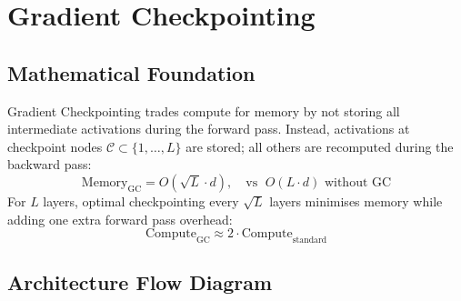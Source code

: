\newpage
\section{Gradient Checkpointing}

\subsection{Mathematical Foundation}
Gradient Checkpointing trades compute for memory by not storing all intermediate activations during the forward pass. Instead, activations at checkpoint nodes $\mathcal{C} \subset \{1,\ldots,L\}$ are stored; all others are recomputed during the backward pass:
\begin{equation}
  \text{Memory}_{\text{GC}} = O(\sqrt{L} \cdot d),\quad \text{vs }\; O(L \cdot d) \text{ without GC}
\end{equation}
For $L$ layers, optimal checkpointing every $\sqrt{L}$ layers minimises memory while adding one extra forward pass overhead:
\begin{equation}
  \text{Compute}_{\text{GC}} \approx 2 \cdot \text{Compute}_{\text{standard}}
\end{equation}

\subsection{Architecture Flow Diagram}

